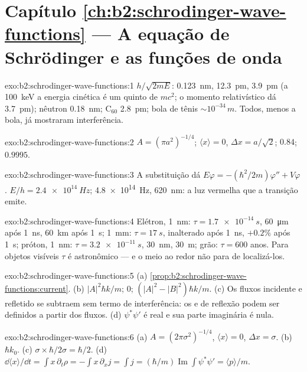 \section*{Capítulo \ref{ch:b2:schrodinger-wave-functions} --- A equação de Schrödinger e as funções de onda}

\begin{solution}{exo:b2:schrodinger-wave-functions:1}
$h/\sqrt{2mE}$: \qty{0.123}{nm}, \qty{12.3}{pm}, \qty{3.9}{pm} (a \qty{100}{keV} a
energia cinética é um quinto de $mc^2$; o momento relativístico dá
\qty{3.7}{pm}); nêutron \qty{0.18}{nm}; C$_{60}$ \qty{2.8}{pm}; bola de tênis
$\sim 10^{-34}\,\unit{m}$. Todos, menos a bola, já mostraram interferência.
\end{solution}

\begin{solution}{exo:b2:schrodinger-wave-functions:2}
$A = (\pi a^2)^{-1/4}$; $\langle x\rangle = 0$, $\Delta x = a/\sqrt2$; $0.84$; $0.9995$.
\end{solution}

\begin{solution}{exo:b2:schrodinger-wave-functions:3}
A substituição dá $E\varphi = -(\hbar^2/2m)\varphi'' + V\varphi$. $E/h =
\qty{2.4e14}{Hz}$; \qty{4.8e14}{Hz}, \qty{620}{nm}: a luz vermelha que a transição
emite.
\end{solution}

\begin{solution}{exo:b2:schrodinger-wave-functions:4}
Elétron, \qty{1}{nm}: $\tau = \qty{1.7e-14}{s}$, \qty{60}{\micro m} após \qty{1}{ns},
\qty{60}{km} após \qty{1}{s}; \qty{1}{mm}: $\tau = \qty{17}{s}$, inalterado após \qty{1}{ns},
$+0.2\%$ após \qty{1}{s}; próton, \qty{1}{nm}: $\tau = \qty{3.2e-11}{s}$, \qty{30}{nm},
\qty{30}{m}; grão: $\tau = 600$ anos. Para objetos visíveis $\tau$ é
astronômico --- e o meio ao redor não para de localizá-los.
\end{solution}

\begin{solution}{exo:b2:schrodinger-wave-functions:5}
(a) \cref{prop:b2:schrodinger-wave-functions:current}. (b) $|A|^2\hbar k/m$;
$0$; $(|A|^2 - |B|^2)\hbar k/m$. (c) Os fluxos incidente e refletido
se subtraem sem termo de interferência: os  e de
reflexão podem ser definidos a partir dos fluxos. (d) $\psi^*\psi'$ é real e sua
parte imaginária é nula.
\end{solution}

\begin{solution}{exo:b2:schrodinger-wave-functions:6}
(a) $A = (2\pi\sigma^2)^{-1/4}$, $\langle x\rangle = 0$, $\Delta x = \sigma$. (b) $\hbar k_0$.
(c) $\sigma \times \hbar/2\sigma = \hbar/2$. (d) $\dd\langle x\rangle/\dd t = \int x\,
\partial_t\rho = -\int x\,\partial_xj = \int j = (\hbar/m)\operatorname{Im}\int\psi^*
\psi' = \langle p\rangle/m$.
\end{solution}


